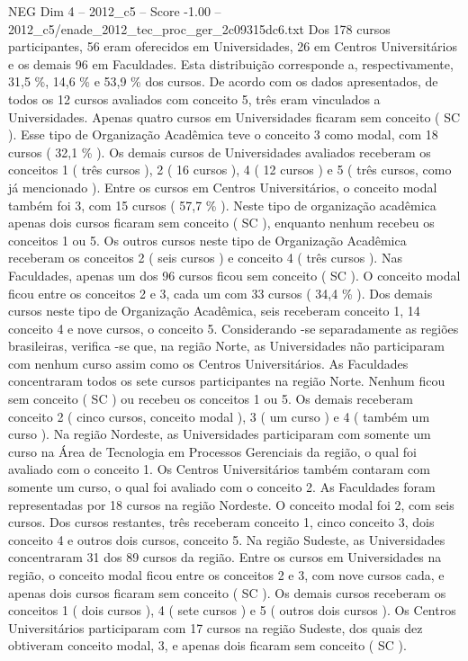 \begin{textsample}{NEG Dim 4 – 2012\_c5 – Score -1.00 – 2012\_c5/enade\_2012\_tec\_proc\_ger\_2c09315dc6.txt}
Dos 178 cursos participantes, 56 eram oferecidos em Universidades, 26 em Centros Universitários e os demais 96 em Faculdades.
Esta distribuição corresponde a, respectivamente, 31,5 \%, 14,6 \% e 53,9 \% dos cursos.
De acordo com os dados apresentados, de todos os 12 cursos avaliados com conceito 5, três eram vinculados a Universidades.
Apenas quatro cursos em Universidades ficaram sem conceito ( SC ).
Esse tipo de Organização Acadêmica teve o conceito 3 como modal, com 18 cursos ( 32,1 \% ).
Os demais cursos de Universidades avaliados receberam os conceitos 1 ( três cursos ), 2 ( 16 cursos ), 4 ( 12 cursos ) e 5 ( três cursos, como já mencionado ).
Entre os cursos em Centros Universitários, o conceito modal também foi 3, com 15 cursos ( 57,7 \% ).
Neste tipo de organização acadêmica apenas dois cursos ficaram sem conceito ( SC ), enquanto nenhum recebeu os conceitos 1 ou 5.
Os outros cursos neste tipo de Organização Acadêmica receberam os conceitos 2 ( seis cursos ) e conceito 4 ( três cursos ).
Nas Faculdades, apenas um dos 96 cursos ficou sem conceito ( SC ).
O conceito modal ficou entre os conceitos 2 e 3, cada um com 33 cursos ( 34,4 \% ).
Dos demais cursos neste tipo de Organização Acadêmica, seis receberam conceito 1, 14 conceito 4 e nove cursos, o conceito 5.
Considerando -se separadamente as regiões brasileiras, verifica -se que, na região Norte, as Universidades não participaram com nenhum curso assim como os Centros Universitários.
As Faculdades concentraram todos os sete cursos participantes na região Norte.
Nenhum ficou sem conceito ( SC ) ou recebeu os conceitos 1 ou 5.
Os demais receberam conceito 2 ( cinco cursos, conceito modal ), 3 ( um curso ) e 4 ( também um curso ).
Na região Nordeste, as Universidades participaram com somente um curso na Área de Tecnologia em Processos Gerenciais da região, o qual foi avaliado com o conceito 1.
Os Centros Universitários também contaram com somente um curso, o qual foi avaliado com o conceito 2.
As Faculdades foram representadas por 18 cursos na região Nordeste.
O conceito modal foi 2, com seis cursos.
Dos cursos restantes, três receberam conceito 1, cinco conceito 3, dois conceito 4 e outros dois cursos, conceito 5.
Na região Sudeste, as Universidades concentraram 31 dos 89 cursos da região.
Entre os cursos em Universidades na região, o conceito modal ficou entre os conceitos 2 e 3, com nove cursos cada, e apenas dois cursos ficaram sem conceito ( SC ).
Os demais cursos receberam os conceitos 1 ( dois cursos ), 4 ( sete cursos ) e 5 ( outros dois cursos ).
Os Centros Universitários participaram com 17 cursos na região Sudeste, dos quais dez obtiveram conceito modal, 3, e apenas dois ficaram sem conceito ( SC ).

\end{textsample}
